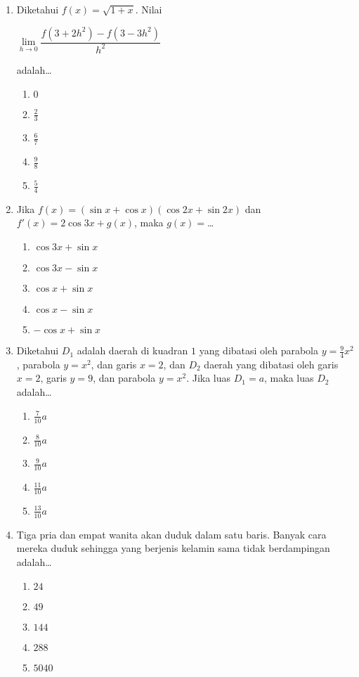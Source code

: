 \documentclass[A4,12PT, english, twocolumn]{journal}
\begin{document}
\begin{enumerate}
\item Diketahui $f(x)=\sqrt{1+x}$. Nilai
\begin{center}
    $\lim\limits_{h \longrightarrow 0} \dfrac{f\left(3+2h^2 \right)-f\left(3-3h^2 \right)}{h^2}$
\end{center}
adalah\dots
    \begin{enumerate}
        \item $0$
        \item $\frac{2}{3}$
        \item $\frac{6}{7}$
        \item $\frac{9}{8}$
        \item $\frac{5}{4}$
    \end{enumerate}

\item Jika $f(x)=\left(\sin{x}+\cos{x} \right)\left(\cos{2x}+\sin{2x} \right)$ dan $f'(x)=2\cos{3x}+g(x)$, maka $g(x)=$\dots
    \begin{enumerate}
        \item $\cos{3x}+\sin{x}$
        \item $\cos{3x}-\sin{x}$
        \item $\cos{x}+\sin{x}$
        \item $\cos{x}-\sin{x}$
        \item $-\cos{x}+\sin{x}$
    \end{enumerate}

\item Diketahui $D_1$ adalah daerah di kuadran $1$ yang dibatasi oleh parabola $y=\frac{9}{4}x^2$, parabola $y=x^2$, dan garis $x=2$, dan $D_2$ daerah yang dibatasi oleh garis $x=2$, garis $y=9$, dan parabola $y=x^2$. Jika luas $D_1=a$, maka luas $D_2$ adalah\dots
    \begin{enumerate}
        \item $\frac{7}{10}a$
        \item $\frac{8}{10}a$
        \item $\frac{9}{10}a$
        \item $\frac{11}{10}a$
        \item $\frac{13}{10}a$
    \end{enumerate}

\item Tiga pria dan empat wanita akan duduk dalam satu baris. Banyak cara mereka duduk sehingga yang berjenis kelamin sama tidak berdampingan adalah\dots
    \begin{enumerate}
        \item $24$
        \item $49$
        \item $144$
        \item $288$
        \item $5040$
    \end{enumerate}


\end{enumerate}
\end{document}
